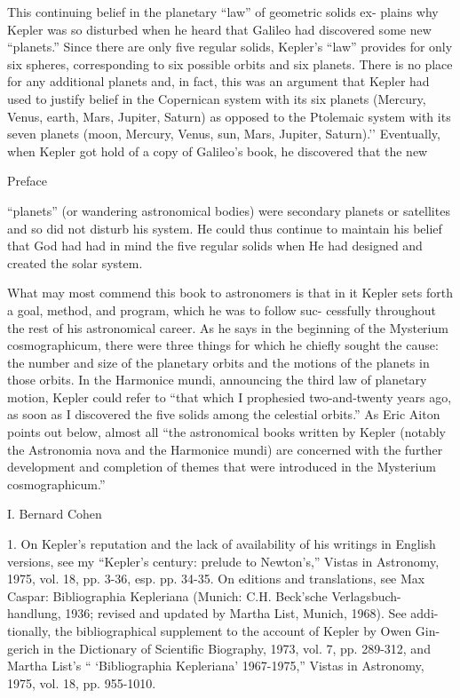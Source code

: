 \documentclass{article}
\begin{document}
This continuing belief in the planetary “law” of geometric solids ex-
plains why Kepler was so disturbed when he heard that Galileo had
discovered some new “planets.” Since there are only five regular solids,
Kepler’s “law” provides for only six spheres, corresponding to six possible
orbits and six planets. There is no place for any additional planets and, in
fact, this was an argument that Kepler had used to justify belief in the
Copernican system with its six planets (Mercury, Venus, earth, Mars,
Jupiter, Saturn) as opposed to the Ptolemaic system with its seven planets
(moon, Mercury, Venus, sun, Mars, Jupiter, Saturn).'’ Eventually, when
Kepler got hold of a copy of Galileo’s book, he discovered that the new

Preface

“planets” (or wandering astronomical bodies) were secondary planets or
satellites and so did not disturb his system. He could thus continue to
maintain his belief that God had had in mind the five regular solids when
He had designed and created the solar system.

What may most commend this book to astronomers is that in it Kepler
sets forth a goal, method, and program, which he was to follow suc-
cessfully throughout the rest of his astronomical career. As he says in the
beginning of the Mysterium cosmographicum, there were three things for
which he chiefly sought the cause: the number and size of the planetary
orbits and the motions of the planets in those orbits. In the Harmonice
mundi, announcing the third law of planetary motion, Kepler could refer
to “that which I prophesied two-and-twenty years ago, as soon as I
discovered the five solids among the celestial orbits.” As Eric Aiton points
out below, almost all “the astronomical books written by Kepler (notably
the Astronomia nova and the Harmonice mundi) are concerned with the
further development and completion of themes that were introduced in
the Mysterium cosmographicum.”

I. Bernard Cohen


1. On Kepler’s reputation and the lack of availability of his writings in English
versions, see my “Kepler’s century: prelude to Newton’s,” Vistas in Astronomy,
1975, vol. 18, pp. 3-36, esp. pp. 34-35. On editions and translations, see Max
Caspar: Bibliographia Kepleriana (Munich: C.H. Beck’sche Verlagsbuch-
handlung, 1936; revised and updated by Martha List, Munich, 1968). See addi-
tionally, the bibliographical supplement to the account of Kepler by Owen Gin-
gerich in the Dictionary of Scientific Biography, 1973, vol. 7, pp. 289-312, and
Martha List’s “ ‘Bibliographia Kepleriana’ 1967-1975,” Vistas in Astronomy, 1975,
vol. 18, pp. 955-1010.
\end{document}
